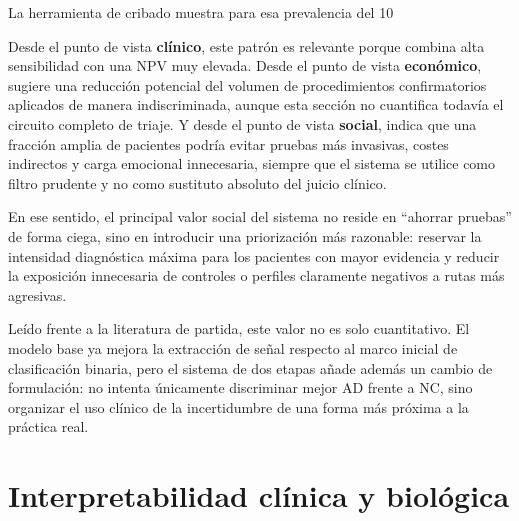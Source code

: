La herramienta de cribado muestra para esa prevalencia del 10%

Desde el punto de vista \textbf{clínico}, este patrón es relevante porque combina alta sensibilidad con una NPV muy
elevada. Desde el punto de vista \textbf{económico}, sugiere una reducción potencial del volumen de procedimientos
confirmatorios aplicados de manera indiscriminada, aunque esta sección no cuantifica todavía el circuito completo de
triaje. Y desde el punto de vista \textbf{social}, indica que una fracción amplia de pacientes podría evitar pruebas más
invasivas, costes indirectos y carga emocional innecesaria, siempre que el sistema se utilice como filtro prudente y no
como sustituto absoluto del juicio clínico.

En ese sentido, el principal valor social del sistema no reside en ``ahorrar pruebas'' de forma ciega, sino en introducir
una priorización más razonable: reservar la intensidad diagnóstica máxima para los pacientes con mayor evidencia y
reducir la exposición innecesaria de controles o perfiles claramente negativos a rutas más agresivas.

Leído frente a la literatura de partida, este valor no es solo cuantitativo. El modelo base ya mejora la extracción de señal respecto al marco inicial de clasificación binaria, pero el sistema de dos etapas añade además un cambio de formulación: no intenta únicamente discriminar mejor AD frente a NC, sino organizar el uso clínico de la incertidumbre de una forma más próxima a la práctica real.

\section{Interpretabilidad clínica y biológica}\label{sec:interpretabilidad}

